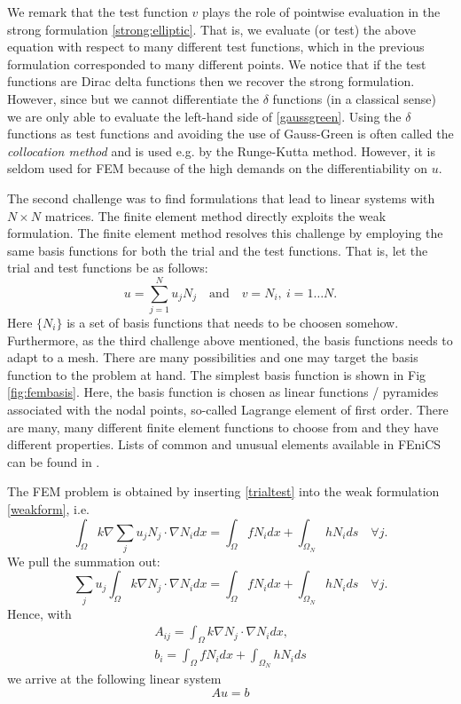 \begin{remark}
We remark that the test function $v$ plays the role of pointwise evaluation in the strong formulation \eqref{strong:elliptic}. That is,
we evaluate (or test) the above equation with respect to many different test functions, which in the previous formulation corresponded to many different points. 
We notice that if the test functions are Dirac delta functions then we recover the  strong formulation. However, since but we cannot differentiate the $\delta$ 
functions (in a classical sense) we are only able to evaluate the left-hand side of \eqref{gaussgreen}.  Using the $\delta$ functions as test functions
and avoiding the use of Gauss-Green is often called
the \emph{collocation method} and is used e.g. by the Runge-Kutta method. However, it is 
seldom used for FEM because of the high demands on the differentiability on $u$. 
\end{remark}


The second challenge was to find formulations that lead to linear systems with $N\times N$ matrices. 
The finite element method directly exploits the weak formulation. The finite element method resolves
this challenge by employing the same basis functions for both the trial and the test functions. 
That is, let 
the trial and test functions be as follows:  
\begin{equation}
\label{trialtest}
	u = \sum_{j=1}^N u_j N_j \quad \text{and} \quad v=N_i, \ i=1\ldots N. 
\end{equation}
Here $\{N_i\}$ is a set of basis functions that needs to be choosen somehow. Furthermore, as the third challenge above mentioned, the 
basis functions needs to adapt to a mesh. 
There are many possibilities and one may target the basis function to the problem at hand. 
The simplest basis function is shown in 
Fig \ref{fig:fembasis}. Here, the basis function is chosen as linear functions / pyramides associated with the nodal points, 
so-called Lagrange element of first order.  
There are many, many different finite element functions to choose from and they have different properties. 
Lists of common and unusual elements available in FEniCS can be found in 
\cite{logg2012automated}. 

The FEM problem is obtained by inserting \eqref{trialtest} into the weak formulation \eqref{weakform}, i.e.   
\[
\int_\Omega k \nabla \sum_j u_j N_j  \cdot \nabla N_i dx = \int_\Omega f N_i dx + \int_{\Omega_N} h N_i ds  \quad \forall j .    
\]
We pull the summation out: 
\[
\sum_j u_j  \int_\Omega k \nabla  N_j  \cdot \nabla N_i dx = \int_\Omega f N_i dx + \int_{\Omega_N} h N_i ds \quad \forall j.    
\]
Hence, with  
\begin{eqnarray*}
A_{ij} = \int_\Omega k \nabla  N_j  \cdot \nabla N_i dx, \\  
b_i = \int_\Omega f N_i dx + \int_{\Omega_N} h N_i ds 
\end{eqnarray*}
we arrive at the following linear system 
\[
A u = b 
\]

